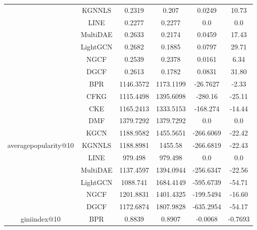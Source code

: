 \begin{table}[H]
{\begin{tabular}{|c|c|c|c|c|c|}
                                       & KGNNLS & 0.2319 & 0.207 & 0.0249 & 10.73 \\ \cline{2-6}
                                       & LINE & 0.2277 & 0.2277 & 0.0 & 0.0 \\ \cline{2-6}
                                       & MultiDAE & 0.2633 & 0.2174 & 0.0459 & 17.43 \\ \cline{2-6}
                                       & LightGCN & 0.2682 & 0.1885 & 0.0797 & 29.71 \\ \cline{2-6}
                                       & NGCF & 0.2539 & 0.2378 & 0.0161 & 6.34 \\ \cline{2-6}
                                       & DGCF & 0.2613 & 0.1782 & 0.0831 & 31.80 \\ \cline{2-6}
            \hline
            \multirow{11}{*}{averagepopularity@10} & BPR & 1146.3572 & 1173.1199 & -26.7627 & -2.33 \\ \cline{2-6}
                                                    & CFKG & 1115.4498 & 1395.6098 & -280.16 & -25.11 \\ \cline{2-6}
                                                    & CKE & 1165.2413 & 1333.5153 & -168.274 & -14.44 \\ \cline{2-6}
                                                    & DMF & 1379.7292 & 1379.7292 & 0.0 & 0.0 \\ \cline{2-6}
                                                    & KGCN & 1188.9582 & 1455.5651 & -266.6069 & -22.42 \\ \cline{2-6}
                                                    & KGNNLS & 1188.8981 & 1455.58 & -266.6819 & -22.43 \\ \cline{2-6}
                                                    & LINE & 979.498 & 979.498 & 0.0 & 0.0 \\ \cline{2-6}
                                                    & MultiDAE & 1137.4597 & 1394.0944 & -256.6347 & -22.56 \\ \cline{2-6}
                                                    & LightGCN & 1088.741 & 1684.4149 & -595.6739 & -54.71 \\ \cline{2-6}
                                                    & NGCF & 1201.8831 & 1401.4325 & -199.5494 & -16.60 \\ \cline{2-6}
                                                    & DGCF & 1172.6874 & 1807.9828 & -635.2954 & -54.17 \\ \cline{2-6}
            \hline
            \multirow{11}{*}{giniindex@10} & BPR & 0.8839 & 0.8907 & -0.0068 & -0.7693 \\ \cline{2-6}

\end{tabular}}
\end{table}
